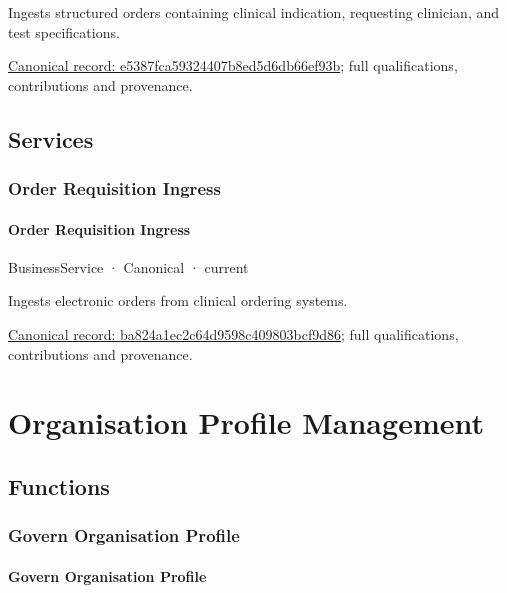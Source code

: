 Ingests structured orders containing clinical indication, requesting clinician, and test specifications.


{\footnotesize \href{../../../../continuum/business/business-function/e5387fca59324407b8ed5d6db66ef93b.md}{Canonical record: e5387fca59324407b8ed5d6db66ef93b}; full qualifications, contributions and provenance.}\par
\subsection{Services}

\subsubsection{Order Requisition Ingress}

\paragraph{Order Requisition Ingress}

\label{element:ba824a1ec2c64d9598c409803bcf9d86}
{\small BusinessService · Canonical · current}\par

Ingests electronic orders from clinical ordering systems.


{\footnotesize \href{../../../../continuum/business/business-service/ba824a1ec2c64d9598c409803bcf9d86.md}{Canonical record: ba824a1ec2c64d9598c409803bcf9d86}; full qualifications, contributions and provenance.}\par
\section{Organisation Profile Management}

\subsection{Functions}

\subsubsection{Govern Organisation Profile}

\paragraph{Govern Organisation Profile}

